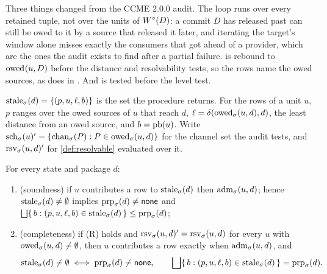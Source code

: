 Three things changed from the CCME 2.0.0 audit. The loop runs over every
retained tuple, not over the units of $W^{\circ}_{}(D)$: a commit $D$ has released
past can still be owed to it by a source that released it later, and iterating
the target's window alone misses exactly the consumers that got ahead of a
provider, which are the ones the audit exists to find after a partial failure.
 is rebound to $\mathrm{owed}_{}(u,D)$ before the distance and
resolvability tests, so the rows name the owed sources, as  does
in . And  is tested before the level test.

\begin{definition}
\label{def:stale}
$\mathrm{stale}_{\sigma}(d) = \{(p,u,\ell,b)\}$ is the set the procedure returns. For the
rows of a unit $u$, $p$ ranges over the owed sources of $u$ that reach $d$,
$\ell = \delta(\mathrm{owed}_{\sigma}(u,d),d)$, the least distance from an owed source,
and $b = \mathrm{pb}(u)$. Write $\mathrm{sch}_{\sigma}(u)' = \{\mathrm{chan}_{\sigma}(P) : P \in
\mathrm{owed}_{\sigma}(u,d)\}$ for the channel set the audit tests, and
$\mathrm{rsv}_{\sigma}(u,d)'$ for \cref{def:resolvable} evaluated over it.
\end{definition}

\begin{theorem}[duality]
\label{thm:duality}
For every state \st{} and package $d$:
\begin{enumerate}[label=(\alph*),leftmargin=2.4em]
  \item (soundness) if $u$ contributes a row to $\mathrm{stale}_{\sigma}(d)$ then
    $\mathrm{adm}_{\sigma}(u,d)$; hence $\mathrm{stale}_{\sigma}(d) \neq \emptyset$ implies
    $\mathrm{prp}_{\sigma}(d) \neq \mathsf{none}$ and $\bigsqcup\{\, b : (p,u,\ell,b) \in
    \mathrm{stale}_{\sigma}(d) \,\} \leq \mathrm{prp}_{\sigma}(d)$; \label{du:sound}
  \item (completeness) if (R) holds and $\mathrm{rsv}_{\sigma}(u,d)' =
    \mathrm{rsv}_{\sigma}(u,d)$ for every $u$ with $\mathrm{owed}_{\sigma}(u,d) \neq \emptyset$,
    then $u$ contributes a row exactly when $\mathrm{adm}_{\sigma}(u,d)$, and
    \[
      \mathrm{stale}_{\sigma}(d) \neq \emptyset
      \iff \mathrm{prp}_{\sigma}(d) \neq \mathsf{none},
      \qquad
      \bigsqcup\{\, b : (p,u,\ell,b) \in \mathrm{stale}_{\sigma}(d) \,\} = \mathrm{prp}_{\sigma}(d).
    \] \label{du:complete}
\end{enumerate}
\end{theorem}


